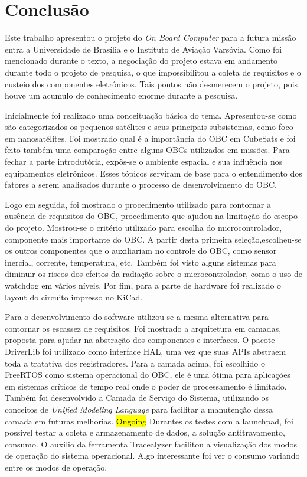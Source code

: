 \section{Conclusão}

Este trabalho apresentou o projeto do \textit{On Board Computer} para a futura missão entra a Universidade de Brasília e o Instituto de Aviação Varsóvia. Como foi mencionado durante o texto, a negociação do projeto estava em andamento durante todo o projeto de pesquisa, o que impossibilitou a coleta de requisitos e o custeio dos componentes eletrônicos. Tais pontos não desmerecem o projeto, pois houve um acumulo de conhecimento enorme durante a pesquisa. 

Inicialmente foi realizado uma conceituação básica do tema. Apresentou-se como são categorizados os pequenos satélites e seus principais subsistemas, como foco em nanosatélites. Foi mostrado qual é a importância do OBC em CubeSats e foi feito também uma comparação entre alguns OBCs utilizados em missões.  Para fechar a parte introdutória, expôs-se o ambiente espacial e sua influência nos equipamentos eletrônicos. Esses tópicos serviram de base para o entendimento dos fatores a serem analisados durante o processo de desenvolvimento do OBC.
 
Logo em seguida, foi mostrado o procedimento utilizado para contornar a ausência de requisitos do OBC, procedimento que ajudou na limitação do escopo do projeto. Mostrou-se o critério utilizado para escolha do microcontrolador, componente mais importante do OBC. A partir desta primeira seleção,escolheu-se os outros componentes que o auxiliariam no controle do OBC, como sensor inercial, corrente, temperatura, etc. Também foi visto alguns sistemas para diminuir os riscos dos efeitos da radiação sobre o microcontrolador, como o uso de watchdog em vários níveis. Por fim, para a parte de hardware foi realizado o layout do circuito impresso no KiCad.

Para o desenvolvimento do software utilizou-se a mesma alternativa para contornar os escassez de requisitos. Foi mostrado a arquitetura em camadas, proposta para ajudar na abstração dos componentes e interfaces. O pacote DriverLib foi utilizado como interface HAL, uma vez que suas APIs abstraem toda a tratativa dos registradores. Para a camada acima, foi escolhido o FreeRTOS como sistema operacional do OBC, ele é uma ótima para aplicações em sistemas críticos de tempo real onde o poder de processamento é limitado. Também foi desenvolvido a Camada de Serviço do Sistema, utilizando os conceitos de \textit{Unified Modeling Language} para facilitar a manutenção dessa camada em futuras melhorias. \newline\hl{Ongoing}\newline
Durantes os testes com a launchpad, foi possível testar a coleta e armazenamento de dados, a solução antitravamento, consumo. O auxilio da ferramenta Tracealyzer facilitou a visualização dos modos de operação do sistema operacional. Algo interessante foi ver o consumo variando entre os modos de operação. 

